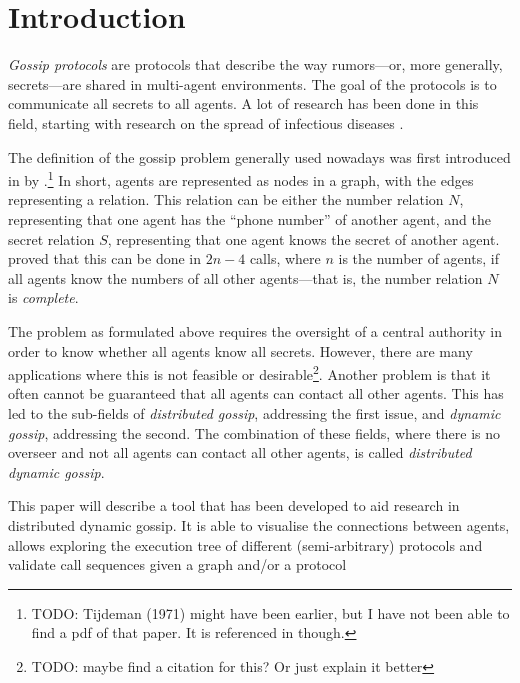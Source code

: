 
\section{Introduction}\label{sec:introduction}

\textit{Gossip protocols} are protocols that describe the way rumors---or, more generally, secrets---are shared in multi-agent environments.
The goal of the protocols is to communicate all secrets to all agents.
A lot of research has been done in this field, 
starting with research on the spread of infectious diseases \parencite{kermack_contribution_1927}.

The definition of the gossip problem generally used nowadays was first introduced in \citeyear{hajnal_cure_1972} by \citeauthor{hajnal_cure_1972}.\footnote{TODO: Tijdeman (1971) might have been earlier, but I have not been able to find a pdf of that paper. It is referenced in \Textcite{van_ditmarsch_dynamic_2018} though.}
In short, agents are represented as nodes in a graph, with the edges representing a relation.
This relation can be either the number relation \(N\), representing that one agent has the ``phone number'' of another agent,
and the secret relation \(S\), representing that one agent knows the secret of another agent.
 proved that this can be done in \(2n-4\) calls, where \(n\) is the number of agents, if all agents know the numbers of all other agents---that is, the number relation \(N\) is \textit{complete}.

The problem as formulated above requires the oversight of a central authority in order to know whether all agents know all secrets.
However, there are many applications where this is not feasible or desirable\footnote{TODO: maybe find a citation for this? Or just explain it better}.
Another problem is that it often cannot be guaranteed that all agents can contact all other agents.
This has led to the sub-fields of \textit{distributed gossip}, addressing the first issue, and \textit{dynamic gossip}, addressing the second.
The combination of these fields, where there is no overseer and not all agents can contact all other agents, is called \textit{distributed dynamic gossip}.


This paper will describe a tool that has been developed to aid research in distributed dynamic gossip.
It is able to visualise the connections between agents, allows exploring the execution tree of different (semi-arbitrary) protocols and validate call sequences given a graph and/or a protocol

